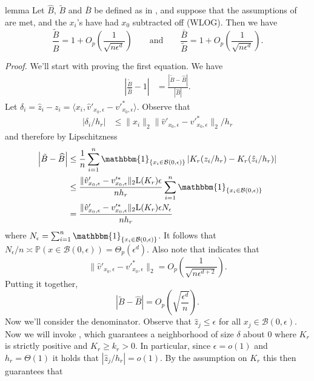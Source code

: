 \documentclass[11pt]{article}
\begin{document}
\begin{restatable}{lemma}{} \label{lemma: regression ratios}
    Let $\widehat{B}$, $\tilde{B}$ and $\bar{B}$ be defined as in , and suppose that the assumptions of  are met, and the $x_i$'s have had $x_0$ subtracted off (WLOG). Then we have
    \begin{equation}
        \frac{\tilde{B}}{\widehat{B}} =  1 +  O_p\left(\frac{1}{\sqrt{n\epsilon^d}}\right) \qquad \text{and} \qquad 
        \frac{\bar{B}}{\tilde{B}} = 1 + O_p\left(\frac{1}{\sqrt{n\epsilon^d}}\right).
    \end{equation}
\end{restatable}
\noindent \textit{Proof.} We'll start with proving the first equation. We have
\begin{align*}
    \left|\frac{\tilde{B}}{\widehat{B}} - 1\right| &= \frac{\left|\tilde{B} - \widehat{B}\right|}{\left|\widehat{B}\right|}.
\end{align*}
Let $\delta_i = \hat{z}_i - z_i = \langle x_i , \hat{v}'_{x_0, \epsilon} - v'^*_{x_0, \epsilon} \rangle$. Observe that
\begin{align*}
    \left|\delta_i/h_r\right| &\leq \|x_i\|_2\|\hat{v}'_{x_0, \epsilon} - v'^*_{x_0, \epsilon}\|_2/h_r
\end{align*}
and therefore by Lipschitzness
\begin{align}
    \left|\tilde{B} - \widehat{B}\right| &\leq \frac{1}{n}\sum_{i = 1}^{n}\mathbbm{1}_{\{x_i \in \mathcal{B}(0, \epsilon)\}}\left|K_r(z_i/h_r) - K_r(\hat{z}_i/h_r)\right| \\
    &\leq \frac{\|\hat{v}'_{x_0, \epsilon} - v'^*_{x_0, \epsilon}\|_2\text{L}(K_r)\epsilon}{nh_r}\sum_{i = 1}^{n}\mathbbm{1}_{\{x_i \in \mathcal{B}(0, \epsilon)\}} \\
    &= \frac{\|\hat{v}'_{x_0, \epsilon} - v'^*_{x_0, \epsilon}\|_2\text{L}(K_r)\epsilon N_{\epsilon}}{nh_r}
\end{align}
where $N_\epsilon = \sum_{i = 1}^{n}\mathbbm{1}_{\{x_i \in \mathcal{B}(0, \epsilon)\}}$. It follows that $N_{\epsilon}/n \asymp \mathbb{P}(x \in \mathcal{B}(0,\epsilon)) = \Theta_p(\epsilon^d)$. Also note that  indicates that 
\[\|\hat{v}'_{x_0, \epsilon} - v'^*_{x_0, \epsilon}\|_2 = O_p\left(\frac{1}{\sqrt{n\epsilon^{d+2}}}\right).\]
Putting it together,
\[\left|\tilde{B} - \widehat{B}\right| = O_p\left(\sqrt{\frac{\epsilon^d}{n}}\right).\]
Now we'll consider the denominator. Observe that $\hat{z}_j \leq \epsilon$ for all $x_j \in \mathcal{B}(0, \epsilon)$. Now we will invoke , which guarantees a neighborhood of size $\delta$ about $0$ where $K_r$ is strictly positive and $K_r \geq k_r > 0$. In particular, since $\epsilon = o(1)$ and $h_r = \Theta(1)$ it holds that $|\hat{z}_j/h_r| = o(1)$. By the assumption on $K_r$ this then guarantees that
\end{document}

